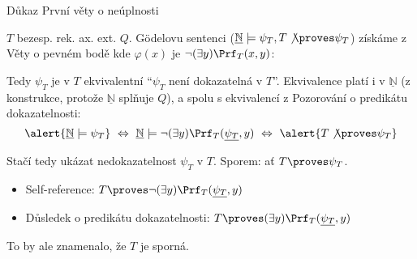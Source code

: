 \documentclass{beamer}
\begin{document}
\begin{frame}{Důkaz První věty o neúplnosti}

    \pause
    $T$ bezesp. rek. ax. ext. $Q$. Gödelovu sentenci ($\underline{\mathbb N}\models\psi_T,T\not\proves\psi_T$) získáme z Věty o pevném bodě kde $\varphi(x)$ je \alert{$\neg(\exists y)\Prf_T(x,y)$}:

    \pause

    \pause
    Tedy $\psi_T$ je v $T$ ekvivalentní ``$\psi_T$ není dokazatelná v $T$''. Ekvivalence platí i v $\underline{\mathbb N}$ (z konstrukce, protože $\underline{\mathbb N}$ splňuje $Q$), a spolu s ekvivalencí z Pozorování o predikátu dokazatelnosti: \pause
    $$
    \alert{\underline{\mathbb N}\models\psi_T}\ \Leftrightarrow\ 
    \underline{\mathbb N}\models\neg(\exists y)\Prf_T(\underline{\psi_T},y)\ \Leftrightarrow\ \alert{T\not\proves\psi_T}
    $$    

    \pause
    Stačí tedy ukázat nedokazatelnost $\psi_T$ v $T$. \alert{Sporem: ať $T\proves\psi_T$. }
    
    \pause
    \begin{itemize}
        \item Self-reference: $T\proves\neg(\exists y)\Prf_T(\underline{\psi_T},y)$\pause
        \item Důsledek o predikátu dokazatelnosti: $T\proves (\exists y)\Prf_T(\underline{\psi_T},y)$\pause
    \end{itemize}
    To by ale znamenalo, že $T$ je sporná.\hfill\qedsymbol
    
\end{frame}
\end{document}
